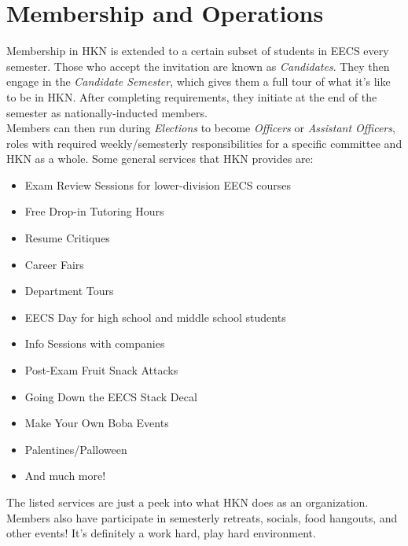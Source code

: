 \documentclass[11pt, article, oneside]{memoir}
\begin{document}
    \section{Membership and Operations}
    \label{sec:membership-and-operations}
        Membership in HKN is extended to a certain subset of students in EECS every semester.
        Those who accept the invitation are known as \emph{Candidates}.
        They then engage in the \emph{Candidate Semester}, which gives them a full tour of what it's like to be in HKN.
        After completing requirements, they initiate at the end of the semester as nationally-inducted members. \\

        Members can then run during \emph{Elections} to become \emph{Officers} or \emph{Assistant Officers}, roles with required weekly/semesterly responsibilities for a specific committee and HKN as a whole.
        Some general services that HKN provides are:
        \begin{itemize}
            \item Exam Review Sessions for lower-division EECS courses
            \item Free Drop-in Tutoring Hours
            \item Resume Critiques
            \item Career Fairs
            \item Department Tours
            \item EECS Day for high school and middle school students
            \item Info Sessions with companies
            \item Post-Exam Fruit Snack Attacks
            \item Going Down the EECS Stack Decal
            \item Make Your Own Boba Events
            \item Palentines/Palloween
            \item And much more!
        \end{itemize}
        The listed services are just a peek into what HKN does as an organization.
        Members also have participate in semesterly retreats, socials, food hangouts, and other events!
        It's definitely a work hard, play hard environment.
\end{document}
